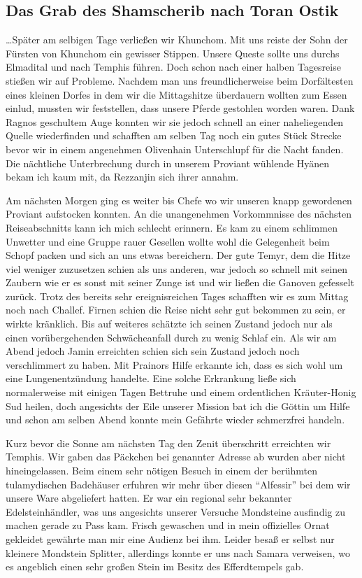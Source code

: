 \subsection{Das Grab des Shamscherib nach Toran Ostik}

\dots Später am selbigen Tage verließen wir Khunchom. Mit uns reiste der Sohn der Fürsten von Khunchom ein gewisser Stippen. Unsere Queste sollte uns durchs Elmadital und nach Temphis führen. Doch schon nach einer halben Tagesreise stießen wir auf Probleme. Nachdem man uns freundlicherweise beim Dorfältesten eines kleinen Dorfes in dem wir die Mittagshitze überdauern wollten zum Essen einlud, mussten wir feststellen, dass unsere Pferde gestohlen worden waren. Dank Ragnos geschultem Auge konnten wir sie jedoch schnell an einer naheliegenden Quelle wiederfinden und schafften am selben Tag noch ein gutes Stück Strecke bevor wir in einem angenehmen Olivenhain Unterschlupf für die Nacht fanden. Die nächtliche Unterbrechung durch in unserem Proviant wühlende Hyänen bekam ich kaum mit, da Rezzanjin sich ihrer annahm.

Am nächsten Morgen ging es weiter bis Chefe wo wir unseren knapp gewordenen Proviant aufstocken konnten. An die unangenehmen Vorkommnisse des nächsten Reiseabschnitts kann ich mich schlecht erinnern. Es kam zu einem schlimmen Unwetter und eine Gruppe rauer Gesellen wollte wohl die Gelegenheit beim Schopf packen und sich an uns etwas bereichern. Der gute Temyr, dem die Hitze viel weniger zuzusetzen schien als uns anderen, war jedoch so schnell mit seinen Zaubern wie er es sonst mit seiner Zunge ist und wir ließen die Ganoven gefesselt zurück. Trotz des bereits sehr ereignisreichen Tages schafften wir es zum Mittag noch nach Challef. Firnen schien die Reise nicht sehr gut bekommen zu sein, er wirkte kränklich. Bis auf weiteres schätzte ich seinen Zustand jedoch nur als einen vorübergehenden Schwächeanfall durch zu wenig Schlaf ein. Als wir am Abend jedoch Jamin erreichten schien sich sein Zustand jedoch noch verschlimmert zu haben. Mit Prainors Hilfe erkannte ich, dass es sich wohl um eine Lungenentzündung handelte. Eine solche Erkrankung ließe sich normalerweise mit einigen Tagen Bettruhe und einem ordentlichen Kräuter-Honig Sud heilen, doch angesichts der Eile unserer Mission bat ich die Göttin um Hilfe und schon am selben Abend konnte mein Gefährte wieder schmerzfrei handeln.

Kurz bevor die Sonne am nächsten Tag den Zenit überschritt erreichten wir Temphis. Wir gaben das Päckchen bei genannter Adresse ab wurden aber nicht hineingelassen. Beim einem sehr nötigen Besuch in einem der berühmten tulamydischen Badehäuser erfuhren wir mehr über diesen ``Alfessir'' bei dem wir unsere Ware abgeliefert hatten. Er war ein regional sehr bekannter Edelsteinhändler, was uns angesichts unserer Versuche Mondsteine ausfindig zu machen gerade zu Pass kam. Frisch gewaschen und in mein offizielles Ornat gekleidet gewährte man mir eine Audienz bei ihm. Leider besaß er selbst nur kleinere Mondstein Splitter, allerdings konnte er uns nach Samara verweisen, wo es angeblich einen sehr großen Stein im Besitz des Efferdtempels gab.

